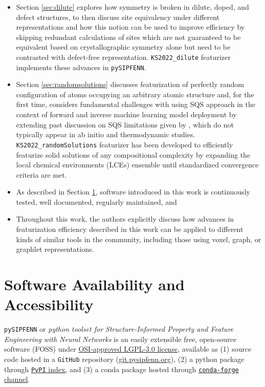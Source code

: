 \begin{itemize}
    
    \item Section \ref{sec:dilute} explores how symmetry is broken in dilute, doped, and defect structures, to then discuss site equivalency under different representations and how this notion can be used to improve efficiency by skipping redundant calculations of sites which are not guaranteed to be equivalent based on crystallographic symmetry alone but need to be contrasted with defect-free representation. \texttt{KS2022\_dilute} featurizer implements these advances in \texttt{pySIPFENN}.

    \item Section \ref{sec:randomsolutions} discusses featurization of perfectly random configuration of atoms occupying an arbitrary atomic structure and, for the first time, considers fundamental challenges with using SQS approach in the context of forward and inverse machine learning model deployment by extending past discussion on SQS limitations given by \citet{VanDeWalle2013EfficientStructures}, which do not typically appear in ab initio and thermodynamic studies. \texttt{KS2022\_randomSolutions} featurizer 
    has been developed to efficiently featurize solid solutions of any compositional complexity by expanding the local chemical environments (LCEs) ensemble until standardized convergence criteria are met.

    \item As described in Section \ref{sec:softwareavaialbility}, software introduced in this work is continuously tested, well documented, regularly maintained, and 

    \item Throughout this work, the authors explicitly discuss how advances in featurization efficiency described in this work can be applied to different kinds of similar tools in the community, including those using voxel, graph, or graphlet representations.
    
\end{itemize}


\section{Software Availability and Accessibility} \label{sec:softwareavaialbility}

\texttt{pySIPFENN} or \textit{python toolset for Structure-Informed Property and Feature Engineering with Neural Networks} is an easily extensible free, open-source software (FOSS) under \href{https://opensource.org/license/lgpl-3-0}{OSI-approved LGPL-3.0 license}, available as (1) source code hosted in a \texttt{GitHub} repository (\href{https://git.pysipfenn.org/}{git.pysipfenn.org}), (2) a python package through \href{https://pypi.org/project/pysipfenn/}{\texttt{PyPI} index}, and (3) a conda package hosted through \href{https://anaconda.org/conda-forge/pysipfenn}{\texttt{conda-forge} channel}.

